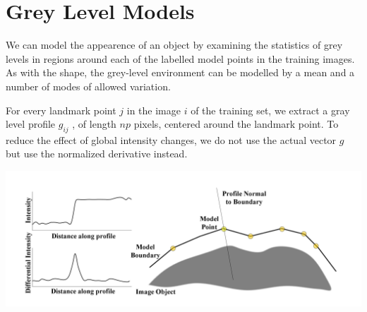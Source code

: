 \section{Grey Level Models}
We can model the appearence of an object by examining
the statistics of grey levels in regions around each
of the labelled model points in the training images.
As with the shape, the grey-level environment can be
modelled by a mean and a number of modes of allowed variation.

For every landmark point $j$ in the image $i$ of the
training set, we extract a gray level profile $g_{ij}$ , of length
$np$ pixels, centered around the landmark point.
To reduce the effect of global intensity changes, we do not use
the actual vector $g$ but use the normalized derivative instead.

\includegraphics[width=\linewidth]{img/grey-level}
